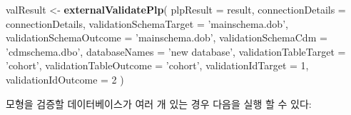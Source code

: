 \documentclass[11pt]{book}
\newenvironment{Shaded}{\begin{snugshade}}{\end{snugshade}}
\newcommand{\KeywordTok}[1]{\textcolor[rgb]{0.13,0.29,0.53}{\textbf{#1}}}
\newcommand{\DataTypeTok}[1]{\textcolor[rgb]{0.13,0.29,0.53}{#1}}
\newcommand{\DecValTok}[1]{\textcolor[rgb]{0.00,0.00,0.81}{#1}}
\newcommand{\StringTok}[1]{\textcolor[rgb]{0.31,0.60,0.02}{#1}}
\newcommand{\NormalTok}[1]{#1}
\theoremstyle{definition}
\theoremstyle{definition}
\theoremstyle{definition}
\theoremstyle{remark}
\begin{document}
\begin{Shaded}
\begin{Highlighting}[]
\NormalTok{valResult <-}\StringTok{ }\KeywordTok{externalValidatePlp}\NormalTok{(}
    \DataTypeTok{plpResult =}\NormalTok{ result, }
    \DataTypeTok{connectionDetails =}\NormalTok{ connectionDetails,}
    \DataTypeTok{validationSchemaTarget =} \StringTok{'mainschema.dob'}\NormalTok{,}
    \DataTypeTok{validationSchemaOutcome =} \StringTok{'mainschema.dob'}\NormalTok{,}
    \DataTypeTok{validationSchemaCdm =} \StringTok{'cdmschema.dbo'}\NormalTok{,}
    \DataTypeTok{databaseNames =} \StringTok{'new database'}\NormalTok{,}
    \DataTypeTok{validationTableTarget =} \StringTok{'cohort'}\NormalTok{,}
    \DataTypeTok{validationTableOutcome =} \StringTok{'cohort'}\NormalTok{,}
    \DataTypeTok{validationIdTarget =} \DecValTok{1}\NormalTok{,}
    \DataTypeTok{validationIdOutcome =} \DecValTok{2}
\NormalTok{)}
\end{Highlighting}
\end{Shaded}

모형을 검증할 데이터베이스가 여러 개 있는 경우 다음을 실행 할 수 있다:
\end{document}
